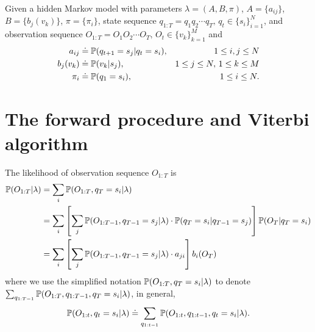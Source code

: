 Given a hidden Markov model with parameters $\lambda = (A, B, \pi)$,
$A = \{a_{ij}\}$, $B = \{b_j(v_k)\}$, $\pi = \{\pi_i\}$, 
state sequence $q_{1:T} = q_1 q_2 \cdots q_T, \, q_t \in \{s_i\}_{i=1}^N$,
and observation sequence $O_{1:T} = O_1 O_2 \cdots O_T, \, O_t \in \{v_k\}_{k=1}^M$ and
\begin{equation}
\label{eq:notebasic}
\begin{aligned}
a_{ij}   & \doteq \mathbb{P}(q_{t+1} = s_j |q_{t} = s_i), & 1 \le i,j \le N \\
b_j(v_k) & \doteq \mathbb{P}(v_k |s_j),                   & 1 \le j \le N, \, 1 \le k \le M   \\
\pi_i    & \doteq \mathbb{P}(q_1 = s_i),                  & 1 \le i \le N.
\end{aligned}
\end{equation}


\section{The forward procedure and Viterbi algorithm}
\label{sec:forward}

The likelihood of observation sequence $O_{1:T}$ is
\begin{align*}
\mathbb{P}(O_{1:T} |\lambda) 
&= \sum_{i} \mathbb{P}(O_{1:T}, q_T = s_i |\lambda) \\
&= \sum_{i} \left[ \sum_{j} \mathbb{P}(O_{1:T-1}, q_{T-1} = s_j |\lambda) \cdot \mathbb{P}(q_T = s_i |q_{T-1} = s_j) \right] \mathbb{P}(O_T |q_T = s_i) \\
&= \sum_{i} \left[ \sum_{j} \mathbb{P}(O_{1:T-1}, q_{T-1} = s_j |\lambda) \cdot a_{ji} \right] b_i(O_T)
\end{align*}
where we use the simplified notation $\mathbb{P}(O_{1:T}, q_T = s_i |\lambda)$ to denote $\sum_{q_{1:T-1}} \mathbb{P}(O_{1:T}, q_{1:T-1}, q_T = s_i |\lambda)$,
\ie in general,
\begin{equation}
\label{eq:notesimp}
\mathbb{P}(O_{1:t}, q_t = s_i |\lambda) \doteq \sum_{q_{1:t-1}} \mathbb{P}(O_{1:t}, q_{1:t-1}, q_t = s_i |\lambda).
\end{equation}

